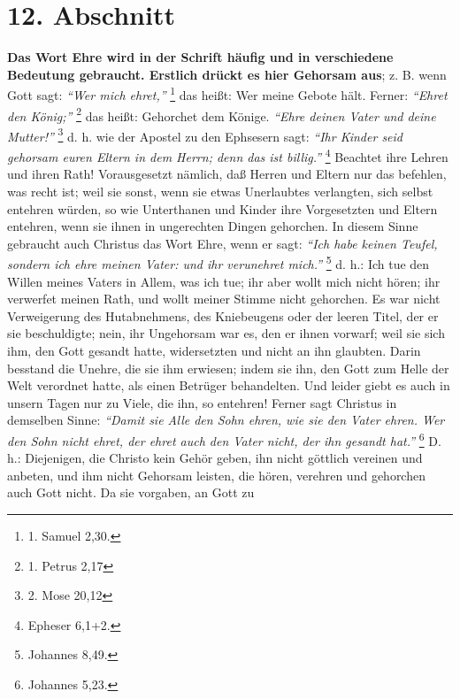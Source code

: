 \section{12. Abschnitt} \label{kap9_ab12}

 \textbf{Das Wort Ehre wird in der Schrift
häufig und in verschiedene Bedeutung
gebraucht. Erstlich drückt es hier Gehorsam aus}; z. B. wenn
Gott sagt:
\textit{"`Wer mich ehret,"'}
\footnote{1. Samuel 2,30.}
das heißt: Wer meine Gebote hält. Ferner:
\textit{"`Ehret den König;"'}
\footnote{1. Petrus 2,17}
das heißt: Gehorchet dem Könige.
\textit{"`Ehre deinen Vater und  deine Mutter!"'}
\footnote{2. Mose 20,12}
d. h. wie der
Apostel zu den Ephsesern sagt:
\textit{"`Ihr Kinder seid gehorsam euren Eltern in dem
Herrn; denn das ist billig."'}
\footnote{Epheser 6,1+2.}
Beachtet ihre Lehren und
ihren Rath! Vorausgesetzt nämlich, daß Herren und Eltern nur das befehlen, was
recht ist; weil sie sonst, wenn sie etwas Unerlaubtes verlangten, sich selbst
entehren würden, so wie Unterthanen und Kinder ihre Vorgesetzten und Eltern
entehren, wenn sie ihnen in ungerechten Dingen gehorchen. In diesem Sinne
gebraucht auch Christus das Wort Ehre, wenn er sagt:
\textit{"`Ich habe keinen Teufel,
sondern ich ehre meinen Vater: und ihr verunehret mich."'}
\footnote{Johannes 8,49.}
d. h.: Ich tue den Willen meines Vaters in Allem, was ich tue; ihr aber wollt
mich nicht hören; ihr verwerfet meinen Rath, und wollt meiner Stimme nicht
gehorchen. Es war nicht Verweigerung des Hutabnehmens, des Kniebeugens oder der
leeren Titel, der er sie beschuldigte; nein, ihr Ungehorsam war es, den er ihnen
vorwarf; weil sie sich ihm, den Gott gesandt hatte, widersetzten und nicht an
ihn glaubten. Darin besstand die Unehre, die sie ihm erwiesen; indem sie ihn,
den Gott zum Helle der Welt verordnet hatte, als einen Betrüger behandelten. Und
leider giebt es auch in unsern Tagen nur zu Viele, die ihn, so entehren! Ferner
sagt Christus in demselben Sinne:
\textit{"`Damit sie Alle den Sohn ehren, wie sie den
Vater ehren. Wer den Sohn nicht ehret, der ehret auch den Vater nicht, der ihn
gesandt hat."'}
\footnote{Johannes 5,23.}
D. h.: Diejenigen, die Christo kein Gehör
geben, ihn nicht göttlich vereinen und anbeten, und ihm nicht Gehorsam leisten,
die hören, verehren und gehorchen auch Gott nicht. Da sie vorgaben, an Gott zu

